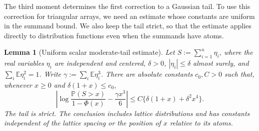 \documentclass[11pt,letterpaper,twoside,leqno]{article}
\theoremstyle{bookplain}
\newtheorem{lemma}{Lemma}
\theoremstyle{bookremark}
\newcommand{\E}{\mathbb E}
\newcommand{\Pp}{\mathbb P}
\begin{document}
The third moment determines the first correction to a Gaussian
tail. To use this correction for triangular arrays, we need an
estimate whose constants are uniform in the summand bound. We
also keep the tail strict, so that the estimate applies directly
to distribution functions even when the summands have atoms.

\begin{lemma}[Uniform scalar moderate-tail estimate]
\label{opt:moderate-tail}
Let $S:=\sum_{i=1}^n\eta_i$, where the real variables $\eta_i$ are
independent and centered, $\delta>0$, $|\eta_i|\le\delta$
almost surely, and $\sum_i\E\eta_i^2=1$. Write
$\gamma:=\sum_i\E\eta_i^3$. There are absolute constants $c_0,C>0$
such that, whenever $x\ge0$ and $\delta(1+x)\le c_0$,
\begin{equation}
 \left|\log\frac{\Pp(S>x)}{1-\Phi(x)}
       -\frac{\gamma x^3}{6}\right|
 \le C\{\delta(1+x)+\delta^2x^4\}.
 \label{opt:moderate-tail-formula}
\end{equation}
The tail is strict. The conclusion includes lattice distributions and
has constants independent of the lattice spacing or the position of
$x$ relative to its atoms.
\end{lemma}
\end{document}
